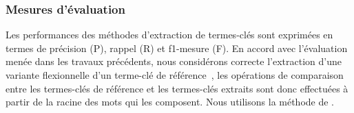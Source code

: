       \subsubsection{Mesures d'évaluation}
      \label{subsubsec:main:domain_independent_keyphrase_extraction-unsupervised_automatic_keyphrase_extraction-evaluation-evaluation_measures}
        Les performances des méthodes d'extraction de termes-clés sont exprimées
        en termes de précision (P), rappel (R) et f1-mesure (F). En
        accord avec l'évaluation menée dans les \mbox{travaux} précédents, nous
        considérons correcte l'extraction d'une variante flexionnelle d'un
        terme-clé de référence~\cite{kim2010semeval}, les opérations de
        comparaison entre les termes-clés de référence et les termes-clés
        extraits sont donc effectuées à partir de la racine des mots qui les
        composent. Nous utilisons la méthode de
        .

